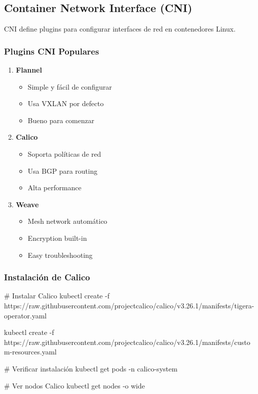 \documentclass[11pt,a4paper]{article}
\begin{document}
\subsection{Container Network Interface (CNI)}

CNI define plugins para configurar interfaces de red en contenedores Linux.

\subsubsection{Plugins CNI Populares}

\begin{enumerate}
    \item \textbf{\textcolor{k8sblue}{Flannel}}
    \begin{itemize}
        \item Simple y fácil de configurar
        \item Usa VXLAN por defecto
        \item Bueno para comenzar
    \end{itemize}
    
    \item \textbf{\textcolor{k8ssuccess}{Calico}}
    \begin{itemize}
        \item Soporta políticas de red
        \item Usa BGP para routing
        \item Alta performance
    \end{itemize}
    
    \item \textbf{\textcolor{k8swarning}{Weave}}
    \begin{itemize}
        \item Mesh network automático
        \item Encryption built-in
        \item Easy troubleshooting
    \end{itemize}
\end{enumerate}

\subsubsection{Instalación de Calico}

\begin{commandbox}
\# Instalar Calico
kubectl create -f \\
  https://raw.githubusercontent.com/projectcalico/calico/v3.26.1/manifests/tigera-operator.yaml

kubectl create -f \\
  https://raw.githubusercontent.com/projectcalico/calico/v3.26.1/manifests/custom-resources.yaml

\# Verificar instalación
kubectl get pods -n calico-system

\# Ver nodos Calico
kubectl get nodes -o wide
\end{commandbox}
\end{document}
